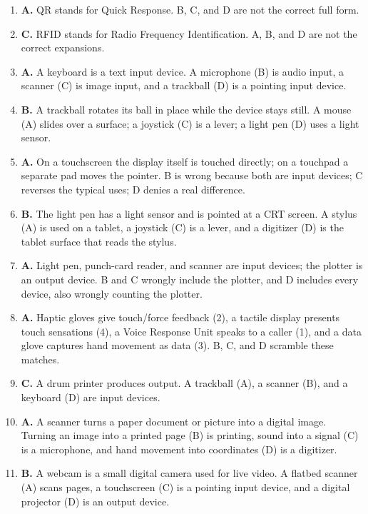 \begin{enumerate}[label=\textbf{Q\arabic*.}, leftmargin=*]
\item \textbf{A.} QR stands for Quick Response. B, C, and D are not the
  correct full form.
\item \textbf{C.} RFID stands for Radio Frequency Identification. A, B, and D
  are not the correct expansions.
\item \textbf{A.} A keyboard is a text input device. A microphone (B) is
  audio input, a scanner (C) is image input, and a trackball (D) is a
  pointing input device.
\item \textbf{B.} A trackball rotates its ball in place while the device
  stays still. A mouse (A) slides over a surface; a joystick (C) is a lever;
  a light pen (D) uses a light sensor.
\item \textbf{A.} On a touchscreen the display itself is touched directly;
  on a touchpad a separate pad moves the pointer. B is wrong because both are
  input devices; C reverses the typical uses; D denies a real difference.
\item \textbf{B.} The light pen has a light sensor and is pointed at a CRT
  screen. A stylus (A) is used on a tablet, a joystick (C) is a lever, and a
  digitizer (D) is the tablet surface that reads the stylus.
\item \textbf{A.} Light pen, punch-card reader, and scanner are input devices;
  the plotter is an output device. B and C wrongly include the plotter, and D
  includes every device, also wrongly counting the plotter.
\item \textbf{A.} Haptic gloves give touch/force feedback (2), a tactile
  display presents touch sensations (4), a Voice Response Unit speaks to a
  caller (1), and a data glove captures hand movement as data (3). B, C, and
  D scramble these matches.
\item \textbf{C.} A drum printer produces output. A trackball (A), a scanner
  (B), and a keyboard (D) are input devices.
\item \textbf{A.} A scanner turns a paper document or picture into a digital
  image. Turning an image into a printed page (B) is printing, sound into a
  signal (C) is a microphone, and hand movement into coordinates (D) is a
  digitizer.
\item \textbf{B.} A webcam is a small digital camera used for live video. A
  flatbed scanner (A) scans pages, a touchscreen (C) is a pointing input
  device, and a digital projector (D) is an output device.

\end{enumerate}
